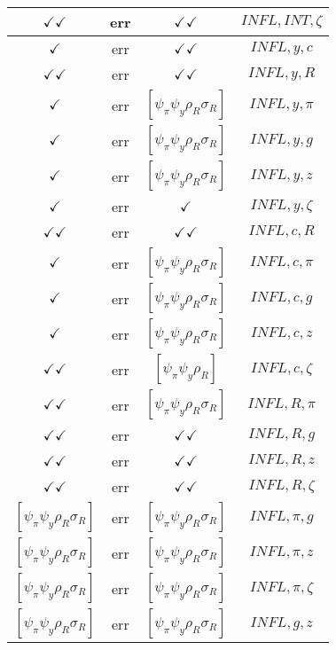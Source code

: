 \documentclass[a4paper,10pt]{article}
\begin{document}
\begin{longtable}{|c|c|c|c|}
\hline
$\checkmark\checkmark$ & err & $\checkmark\checkmark$ & ${INFL},{INT},{\zeta}$ \\
\hline
$\checkmark$ & err & $\checkmark\checkmark$ & ${INFL},{y},{c}$ \\
\hline
$\checkmark\checkmark$ & err & $\checkmark\checkmark$ & ${INFL},{y},{R}$ \\
\hline
$\checkmark$ & err & $[\psi_\pi \psi_y \rho_R \sigma_R ]$ & ${INFL},{y},{\pi}$ \\
\hline
$\checkmark$ & err & $[\psi_\pi \psi_y \rho_R \sigma_R ]$ & ${INFL},{y},{g}$ \\
\hline
$\checkmark$ & err & $[\psi_\pi \psi_y \rho_R \sigma_R ]$ & ${INFL},{y},{z}$ \\
\hline
$\checkmark$ & err & $\checkmark$ & ${INFL},{y},{\zeta}$ \\
\hline
$\checkmark\checkmark$ & err & $\checkmark\checkmark$ & ${INFL},{c},{R}$ \\
\hline
$\checkmark$ & err & $[\psi_\pi \psi_y \rho_R \sigma_R ]$ & ${INFL},{c},{\pi}$ \\
\hline
$\checkmark$ & err & $[\psi_\pi \psi_y \rho_R \sigma_R ]$ & ${INFL},{c},{g}$ \\
\hline
$\checkmark$ & err & $[\psi_\pi \psi_y \rho_R \sigma_R ]$ & ${INFL},{c},{z}$ \\
\hline
$\checkmark\checkmark$ & err & $[\psi_\pi \psi_y \rho_R ]$ & ${INFL},{c},{\zeta}$ \\
\hline
$\checkmark\checkmark$ & err & $[\psi_\pi \psi_y \rho_R \sigma_R ]$ & ${INFL},{R},{\pi}$ \\
\hline
$\checkmark\checkmark$ & err & $\checkmark\checkmark$ & ${INFL},{R},{g}$ \\
\hline
$\checkmark\checkmark$ & err & $\checkmark\checkmark$ & ${INFL},{R},{z}$ \\
\hline
$\checkmark\checkmark$ & err & $\checkmark\checkmark$ & ${INFL},{R},{\zeta}$ \\
\hline
$[\psi_\pi \psi_y \rho_R \sigma_R ]$ & err & $[\psi_\pi \psi_y \rho_R \sigma_R ]$ & ${INFL},{\pi},{g}$ \\
\hline
$[\psi_\pi \psi_y \rho_R \sigma_R ]$ & err & $[\psi_\pi \psi_y \rho_R \sigma_R ]$ & ${INFL},{\pi},{z}$ \\
\hline
$[\psi_\pi \psi_y \rho_R \sigma_R ]$ & err & $[\psi_\pi \psi_y \rho_R \sigma_R ]$ & ${INFL},{\pi},{\zeta}$ \\
\hline
$[\psi_\pi \psi_y \rho_R \sigma_R ]$ & err & $[\psi_\pi \psi_y \rho_R \sigma_R ]$ & ${INFL},{g},{z}$ \\

\end{longtable}
\end{document}

